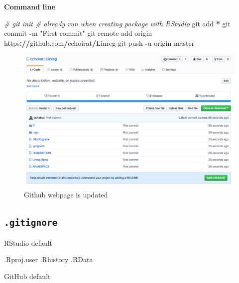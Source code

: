 \documentclass[]{book}
\newenvironment{Shaded}{\begin{snugshade}}{\end{snugshade}}
\newcommand{\StringTok}[1]{\textcolor[rgb]{0.31,0.60,0.02}{#1}}
\newcommand{\CommentTok}[1]{\textcolor[rgb]{0.56,0.35,0.01}{\textit{#1}}}
\newcommand{\OperatorTok}[1]{\textcolor[rgb]{0.81,0.36,0.00}{\textbf{#1}}}
\newcommand{\ErrorTok}[1]{\textcolor[rgb]{0.64,0.00,0.00}{\textbf{#1}}}
\newcommand{\NormalTok}[1]{#1}
\theoremstyle{definition}
\theoremstyle{definition}
\theoremstyle{definition}
\theoremstyle{remark}
\begin{document}
\textbf{Command line}

\begin{Shaded}
\begin{Highlighting}[]
\CommentTok{# git init # already run when creating package with RStudio}
\NormalTok{git add }\OperatorTok{*}
\NormalTok{git commit }\OperatorTok{-}\NormalTok{m }\StringTok{"First commit"}
\NormalTok{git remote add origin https}\OperatorTok{:}\ErrorTok{//}\NormalTok{github.com}\OperatorTok{/}\NormalTok{cchoirat}\OperatorTok{/}\NormalTok{Linreg}
\NormalTok{git push }\OperatorTok{-}\NormalTok{u origin master}
\end{Highlighting}
\end{Shaded}

\begin{figure}

{\centering \includegraphics{images/ch3_pkg_9_github} 

}

\caption{Github webpage is updated}\label{fig:pkg9}
\end{figure}

\subsection{\texorpdfstring{\texttt{.gitignore}}{.gitignore}}\label{gitignore}

RStudio default

\begin{Shaded}
\begin{Highlighting}[]
\NormalTok{.Rproj.user}
\NormalTok{.Rhistory}
\NormalTok{.RData}
\end{Highlighting}
\end{Shaded}

GitHub default
\end{document}

